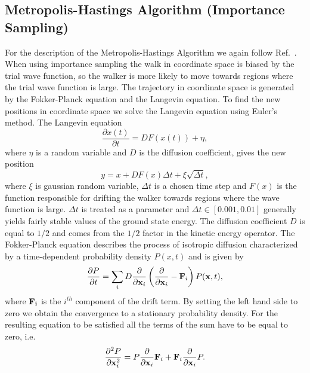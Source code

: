 \documentclass[../main.tex]{subfiles}
\begin{document}
\subsection{Metropolis-Hastings Algorithm (Importance Sampling)}

For the description of the Metropolis-Hastings Algorithm we again follow Ref.~\cite{FYS4411-Slides}.
When using importance sampling the walk in coordinate space is biased by the trial wave function, so the walker is more likely to move towards regions where the trial wave function is large. The trajectory in coordinate space is generated by the Fokker-Planck equation and the Langevin equation. To find the new positions in coordinate space we solve the Langevin equation using Euler's method. The Langevin equation
\begin{equation}\label{Langevin}
 \frac{\partial x(t)}{\partial t} = D F(x(t)) + \eta,
\end{equation}
where $\eta$ is a random variable and $D$ is the diffusion coefficient, gives the new position
\begin{equation}\label{eq: LangevinSolution}
 y = x + DF(x)\Delta t + \xi \sqrt{\Delta t},
\end{equation}
where $\xi$ is gaussian random variable, $\Delta t$ is a chosen time step and $F(x)$ is the function responsible for drifting the walker towards regions where the wave function is large. $\Delta t$ is treated as a parameter and $\Delta t \in [0.001, 0.01]$ generally yields fairly stable values of the ground state energy. The diffusion coefficient $D$ is equal to $1/2$ and comes from the $1/2$ factor in the kinetic energy operator. The Fokker-Planck equation describes the process of isotropic diffusion characterized by a time-dependent probability density $P(x, t)$ and is given by
\begin{equation}
 \frac{\partial P}{\partial t} = \sum_i D \frac{\partial}{\partial {\bf x}_i}\left( \frac{\partial}{\partial {\bf x}_i} - {\bf F}_i \right) P({\bf x}, t),
\end{equation}
where $\bf{F}_i$ is the $i^{th}$ component of the drift term. By setting the left hand side to zero we obtain the convergence to a stationary probability density. For the resulting equation to be satisfied all the terms of the sum have to be equal to zero, i.e.
\begin{equation}\label{stationaryFokker}
 \frac{\partial^2 P}{\partial {\bf x}_i^2} = P \frac{\partial}{\partial {\bf x}_i} {\bf F}_i
 + {\bf F}_i \frac{\partial}{\partial {\bf x}_i} P.
\end{equation}
\end{document}

